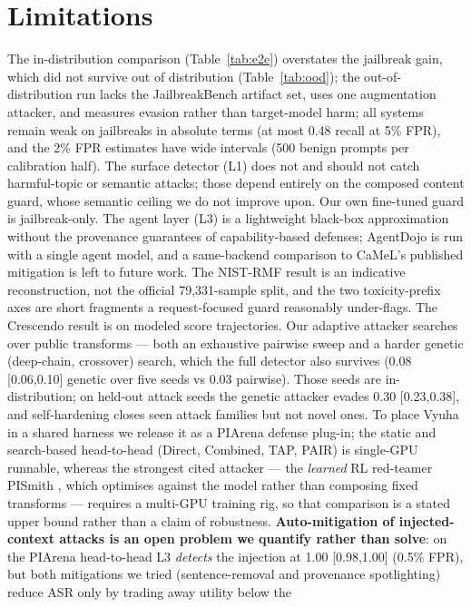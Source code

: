 \documentclass[11pt]{article}
\begin{document}
\section*{Limitations}
The in-distribution comparison (Table~\ref{tab:e2e}) overstates the jailbreak gain, which did not
survive out of distribution (Table~\ref{tab:ood}); the out-of-distribution run lacks the JailbreakBench
artifact set, uses one augmentation attacker, and measures evasion rather than target-model harm; all systems remain weak on jailbreaks in absolute terms
(at most 0.48 recall at 5\% FPR), and the 2\% FPR estimates have wide intervals (500 benign prompts per
calibration half). The surface detector (L1) does not and should not catch harmful-topic or semantic attacks; those
depend entirely on the composed content guard, whose semantic ceiling we do not improve upon. Our own
fine-tuned guard is jailbreak-only. The agent layer (L3) is a lightweight black-box approximation
without the provenance guarantees of capability-based defenses; AgentDojo is run with a single agent model,
and a same-backend comparison to CaMeL's published mitigation is left to future work.
The NIST-RMF result is an indicative reconstruction, not the official 79{,}331-sample split, and the
two toxicity-prefix axes are short fragments a request-focused guard reasonably under-flags. The
Crescendo result is on modeled score trajectories. Our adaptive attacker searches over
public transforms --- both an exhaustive pairwise sweep and a harder genetic (deep-chain, crossover)
search, which the full detector also survives (0.08 [0.06,0.10] genetic over five seeds vs 0.03 pairwise). Those seeds are in-distribution; on held-out
attack seeds the genetic attacker evades 0.30 [0.23,0.38], and self-hardening closes seen attack families
but not novel ones. To place Vyuha in
a shared harness we release it as a PIArena \citep{piarena} defense plug-in; the static and
search-based head-to-head (Direct, Combined, TAP, PAIR) is single-GPU runnable, whereas the strongest
cited attacker --- the \emph{learned} RL red-teamer PISmith \citep{pismith}, which optimises against
the model rather than composing fixed transforms --- requires a multi-GPU training rig, so that
comparison is a stated upper bound rather than a claim of robustness. \textbf{Auto-mitigation of
injected-context attacks is an open problem we quantify rather than solve}: on the PIArena head-to-head
L3 \emph{detects} the injection at 1.00 [0.98,1.00] (0.5\% FPR), but both mitigations we tried
(sentence-removal and provenance spotlighting) reduce ASR only by trading away utility below the
\end{document}
